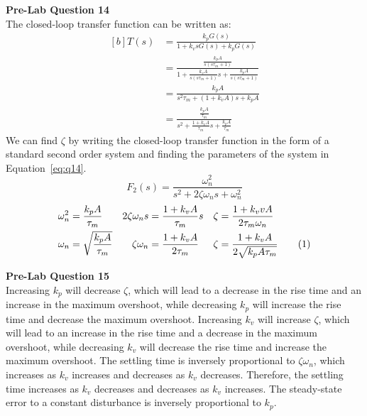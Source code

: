 \documentclass[12pt]{article}
\begin{document}
\textbf{Pre-Lab Question 14} \\
The closed-loop transfer function can be written as:
\begin{equation*}
\begin{aligned}[b]
    T(s) &= \frac{k_pG(s)}{1 + k_vsG(s) + k_pG(s)} \\
    &= \frac{\frac{k_pA}{s(s\tau_m + 1)}}{1 + \frac{k_vA}{s(s\tau_m + 1)}s + \frac{k_pA}{s(s\tau_m + 1)}} \\
    &= \frac{k_pA}{s^2\tau_m + (1 + k_vA)s + k_pA} \\
    &= \frac{\frac{k_pA}{\tau_m}}{s^2 + \frac{1 + k_vA}{\tau_m}s + \frac{k_pA}{\tau_m}} 
\end{aligned}
\end{equation*}
We can find $\zeta$ by writing the closed-loop transfer function in the form of a standard second order system and finding the parameters of the system in Equation~\ref{eq:q14}.
\begin{equation*}
    F_2(s) = \frac{\omega_n^2}{s^2 + 2\zeta\omega_ns + \omega_n^2}
\end{equation*}
\begin{align*}
    \omega_n^2 &= \frac{k_pA}{\tau_m} & 2\zeta\omega_ns &= \frac{1+k_vA}{\tau_m}s & \zeta &= \frac{1+k_vvA}{2\tau_m\omega_n} \\
    \omega_n &= \sqrt{\frac{k_pA}{\tau_m}} & \zeta\omega_n &= \frac{1+k_vA}{2\tau_m} & \zeta &= \frac{1+k_vA}{2\sqrt{k_pA\tau_m}} \stepcounter{equation}\tag{\theequation}\label{eq:q14}
\end{align*}

\textbf{Pre-Lab Question 15} \\
Increasing $k_p$ will decrease $\zeta$, which will lead to a decrease in the rise time and an increase in the maximum overshoot, while decreasing $k_p$ will increase the rise time and decrease the maximum overshoot. Increasing $k_v$ will increase $\zeta$, which will lead to an increase in the rise time and a decrease in the maximum overshoot, while decreasing $k_v$ will decrease the rise time and increase the maximum overshoot. The settling time is inversely proportional to $\zeta\omega_n$, which increases as $k_v$ increases and decreases as $k_v$ decreases. Therefore, the settling time increases as $k_v$ decreases and decreases as $k_v$ increases. The steady-state error to a constant disturbance is inversely proportional to $k_p$. %
\end{document}
